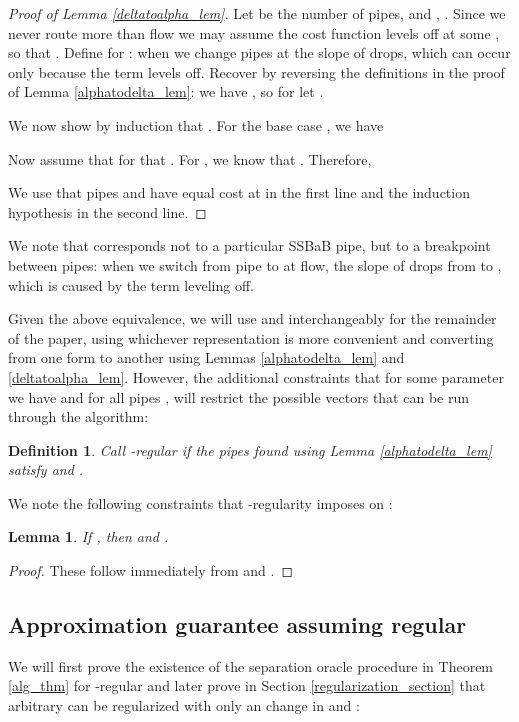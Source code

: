 \documentclass[11pt]{article}
\newtheorem{lem}[thm]{Lemma}
\newtheorem{defn}[thm]{Definition}
\begin{document}
\begin{proof}[Proof of Lemma \ref{deltatoalpha_lem}]
Let  be the number of pipes, and , .  Since we never route more than  flow we may assume the cost function levels off at some , so that .  Define  for : when we change pipes at  the slope of  drops, which can occur only because the term  levels off.  Recover  by reversing the definitions in the proof of Lemma \ref{alphatodelta_lem}:  we have , so for  let .

We now show by induction that .  For the base case , we have

Now assume that for  that .  For , we know that .  Therefore,

We use that pipes  and  have equal cost at  in the first line and the induction hypothesis in the second line.
\end{proof}

We note that  corresponds not to a particular SSBaB pipe, but to a breakpoint between pipes:  when we switch from pipe  to  at  flow, the slope of  drops from  to , which is caused by the term  leveling off.

Given the above equivalence, we will use  and  interchangeably for the remainder of the paper, using whichever representation is more convenient and converting from one form to another using Lemmas \ref{alphatodelta_lem} and \ref{deltatoalpha_lem}.  However, the additional constraints that for some parameter  we have  and  for all pipes , will restrict the possible vectors  that can be run through the algorithm:

\begin{defn} Call  \emph{-regular} if the pipes found using Lemma \ref{alphatodelta_lem} satisfy  and . 
\end{defn}

We note the following constraints that -regularity imposes on :

\begin{lem} \label{alpha_delta_lem}
If , then  and .
\end{lem}

\begin{proof} 
These follow immediately from  and .
\end{proof}

\subsection{Approximation guarantee assuming regular }

We will first prove the existence of the separation oracle procedure  in Theorem \ref{alg_thm} for -regular  and later prove in Section \ref{regularization_section} that arbitrary  can be regularized with only an  change in  and :
\end{document}
